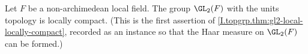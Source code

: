 Let $F$ be a non-archimedean local field. The group $\GL_2(F)$ with the units topology is locally compact. (This is the first assertion of \cref{I.topgrp.thm:gl2-local-locally-compact}, recorded as an instance so that the Haar measure on $\GL_2(F)$ can be formed.)
